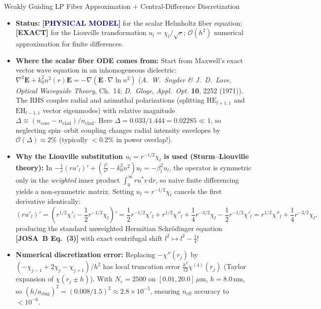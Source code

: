\documentclass[10pt,letterpaper]{article}
\newcommand{\dd}{\mathrm{d}}
\newcommand{\josb}[1]{\textbf{[JOSA~B Eq.~(#1)]}}
\newcommand{\tagexact}{\textcolor{forest}{\textbf{[EXACT]}}}
\newcommand{\tagmodel}{\textcolor{navy}{\textbf{[PHYSICAL MODEL]}}}
\numberwithin{equation}{section}
\begin{document}
\begin{approxbox}{Weakly Guiding LP Fiber Approximation + Central-Difference Discretization}
\begin{itemize}[leftmargin=1.4em,itemsep=2pt,topsep=1pt]
  \item \textbf{Status:} \tagmodel{} for the scalar Helmholtz fiber equation; \tagexact{} for the Liouville transformation $u_l = \chi_l/\sqrt{r}$; $\mathcal{O}(h^2)$ numerical approximation for finite differences.
  \item \textbf{Where the scalar fiber ODE comes from:} Start from Maxwell's exact vector wave equation in an inhomogeneous dielectric: $\nabla^2\mathbf{E} + k_0^2 n^2(r)\mathbf{E} = -\nabla(\mathbf{E}\cdot\nabla\ln n^2)$ (\emph{A.\ W.\ Snyder \& J.\ D.\ Love}, \emph{Optical Waveguide Theory}, Ch.~14; \emph{D.\ Gloge}, \emph{Appl.\ Opt.} \textbf{10}, 2252 (1971)). The RHS couples radial and azimuthal polarizations (splitting $\mathrm{HE}_{l+1,1}$ and $\mathrm{EH}_{l-1,1}$ vector eigenmodes) with relative magnitude $\Delta \equiv (n_{\mathrm{core}} - n_{\mathrm{clad}})/n_{\mathrm{clad}}$. Here $\Delta = 0.033/1.444 = 0.02285 \ll 1$, so neglecting spin--orbit coupling changes radial intensity envelopes by $\mathcal{O}(\Delta) \approx 2\%$ (typically $<0.2\%$ in power overlap!).
  \item \textbf{Why the Liouville substitution $u_l = r^{-1/2}\chi_l$ is used (Sturm--Liouville theory):} In $-\frac{1}{r}(r u'_l)' + (\frac{l^2}{r^2} - k_0^2 n^2) u_l = -\beta_l^2 u_l$, the operator is symmetric only in the \emph{weighted} inner product $\int_0^\infty r u^* v\,\dd r$, so naive finite differencing yields a non-symmetric matrix. Setting $u_l = r^{-1/2}\chi_l$ cancels the first derivative identically:
  \[
    (r u'_l)' = \left(r^{1/2}\chi'_l - \frac{1}{2}r^{-1/2}\chi_l\right)' = \frac{1}{2}r^{-1/2}\chi'_l + r^{1/2}\chi''_l + \frac{1}{4}r^{-3/2}\chi_l - \frac{1}{2}r^{-1/2}\chi'_l = r^{1/2}\chi''_l + \frac{1}{4}r^{-3/2}\chi_l,
  \]
  producing the standard unweighted Hermitian Schr\"odinger equation \josb{3} with exact centrifugal shift $l^2 \mapsto l^2 - \frac{1}{4}$!
  \item \textbf{Numerical discretization error:} Replacing $-\chi''(r_j)$ by $(-\chi_{j-1}+2\chi_j-\chi_{j+1})/h^2$ has local truncation error $\frac{h^2}{12}\chi^{(4)}(r_j)$ (Taylor expansion of $\chi(r_j \pm h)$). With $N_r = 2500$ on $[0.01, 20.0]\,\mu\mathrm{m}$, $h = 8.0\,\mathrm{nm}$, so $(h/a_{\mathrm{ring}})^2 = (0.008/1.5)^2 \approx 2.8\times 10^{-5}$, ensuring $n_{\mathrm{eff}}$ accuracy to $< 10^{-6}$.
\end{itemize}
\end{approxbox}
\end{document}
